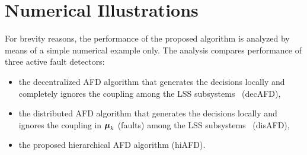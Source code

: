 \documentclass[conference,10pt]{IEEEtran}
\begin{document}
\section{Numerical Illustrations}\label{sec:numerical_illustration}
For brevity reasons, the performance of the proposed algorithm is analyzed by means of a simple numerical example only. 
The analysis compares performance of three active fault detectors:
\begin{itemize}
  \item the decentralized AFD algorithm that generates the decisions locally and completely ignores the coupling among the LSS subsystems~\cite{Straka2019:cp:FUSION} (decAFD),
  \item the distributed AFD algorithm that generates the decisions locally and ignores the coupling in $\boldsymbol{\mu}_k$ (faults) among the LSS subsystems~\cite{Straka2019:cp:FUSION} (disAFD),
  \item the proposed hierarchical AFD algorithm (hiAFD).
\end{itemize}
\end{document}

